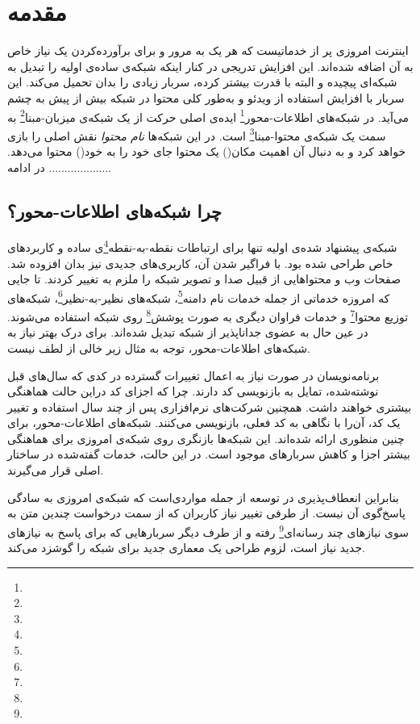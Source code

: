 \chapter{مقدمه}

اینترنت امروزی پر از خدماتیست که هر یک به مرور و برای برآورده‌کردن یک نیاز خاص به آن اضافه شده‌اند. این افزایش تدریجی در کنار اینکه شبکه‌ی ساده‌ی اولیه را تبدیل به شبکه‌ای پیچیده و البته با قدرت بیشتر کرده، سربار‌ زیادی را بدان تحمیل می‌کند. این سربار با افزایش استفاده از ویدئو و به‌طور کلی محتوا در شبکه بیش از پیش به چشم می‌آید. در شبکه‌های اطلاعات-محور\footnote{} ایده‌ی اصلی حرکت از یک شبکه‌ی میزبان-مبنا\footnote{} به سمت یک شبکه‌ی محتوا-مبنا\footnote{} است. در این شبکه‌ها \textit{نام محتوا} نقش اصلی را بازی خواهد کرد و به دنبال آن اهمیت مکان() یک محتوا جای خود را به خود() محتوا می‌دهد. در ادامه ....................


\section{چرا شبکه‌های اطلاعات-محور؟}
شبکه‌ی پیشنهاد شده‌ی اولیه تنها برای ارتباطات نقطه-به-نقطه\footnote{}ی ساده و کاربردهای خاص طراحی شده بود. با فراگیر شدن آن، کاربری‌های جدیدی نیز بدان افزوده شد. صفحات وب و محتواهایی از قبیل صدا و تصویر شبکه را ملزم به تغییر کردند. تا جایی که امروزه خدماتی از جمله خدمات نام دامنه\footnote{}، شبکه‌های نظیر-به-نظیر\footnote{}، شبکه‌های توزیع محتوا\footnote{} و خدمات فراوان دیگری به صورت پوشش\footnote{} روی شبکه استفاده می‌شوند. در عین حال به عضوی جداناپذیر از شبکه تبدیل شده‌اند. برای درک بهتر نیاز به شبکه‌های اطلاعات-محور، توجه به مثال زیر خالی از لطف نیست.

برنامه‌نویسان در صورت نیاز به اعمال تغییرات گسترده در کدی که سال‌های قبل نوشته‌شده، تمایل به بازنویسی کد دارند. چرا که اجزای کد  دراین حالت هماهنگی بیشتری خواهند داشت. همچنین شرکت‌های نرم‌افزاری پس از چند سال استفاده و تغییر یک کد، آن‌را با نگاهی به کد فعلی، بازنویسی می‌کنند. شبکه‌های اطلاعات-محور، برای چنین منظوری ارائه شده‌اند. این شبکه‌ها بازنگری روی شبکه‌ی امروزی برای هماهنگی بیشتر اجزا و کاهش سربارهای موجود است. در این حالت، خدمات گفته‌شده در ساختار اصلی قرار می‌گیرند.

بنابراین انعطاف‌پذیری در توسعه از جمله مواردی‌است که شبکه‌ی امروزی به سادگی پاسخ‌گوی آن نیست. از طرفی تغییر نیاز کاربران که از سمت درخواست چندین متن به سوی نیازهای چند رسانه‌ای\footnote{} رفته و از طرف دیگر سربار‌هایی که برای پاسخ به نیازهای جدید نیاز است،  لزوم طراحی یک معماری جدید برای شبکه را گوشزد می‌کند.


